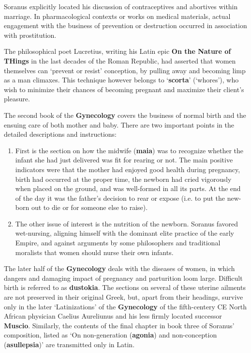 Soranus explicitly located his discussion of contraceptives and abortives within marriage. In pharmacological contexts or works on medical materials, actual engagement with the business of prevention or destruction occurred in association with prostitution. 

\begin{rmk}
    The philosophical poet Lucretius, writing his Latin epic \textbf{On the Nature of THings} in the last decades of the Roman Republic, had asserted that women themselves can `prevent or resist' conception, by pulling away and becoming limp as a man climaxes. This technique however belongs to `\textbf{scorta}' (`whores'), who wish to minimize their chances of becoming pregnant and maximize their client's pleasure.
\end{rmk}

The second book of the \textbf{Gynecology} covers the business of normal birth and the ensuing care of both mother and baby. There are two important points in the detailed descriptions and instructions:
\begin{enumerate}
    \item First is the section on how the midwife (\textbf{maia}) was to recognize whether the infant she had just delivered was fit for rearing or not. The main positive indicators were that the mother had enjoyed good health during pregnancy, birth had occurred at the proper time, the newborn had cried vigorously when placed on the ground, and was well-formed in all its parts. At the end of the day it was the father's decision to rear or expose (i.e. to put the new-born out to die or for someone else to raise).
    \item The other issue of interest is the nutrition of the newborn. Soranus favored wet-nursing, aligning himself with the dominant elite practice of the early Empire, and against arguments by some philosophers and traditional moralists that women should nurse their own infants.
\end{enumerate}

The later half of the \textbf{Gynecology} deals with the diseases of women, in which dangers and damaging impact of pregnancy and parturition loom large. Difficult birth is referred to as \textbf{dustokia}. The sections on several of these uterine ailments are not preserved in their original Greek, but, apart from their headings, survive only in the later `Latinizations' of the \textbf{Gynecology} of the fifth-centery CE North African physician Caelius Aureliunus and his less firmly located successor \textbf{Muscio}. Similarly, the contents of the final chapter in book three of Soranus' composition, listed as `On non-generation (\textbf{agonia}) and non-conception (\textbf{asullepsia})' are transmitted only in Latin. 

